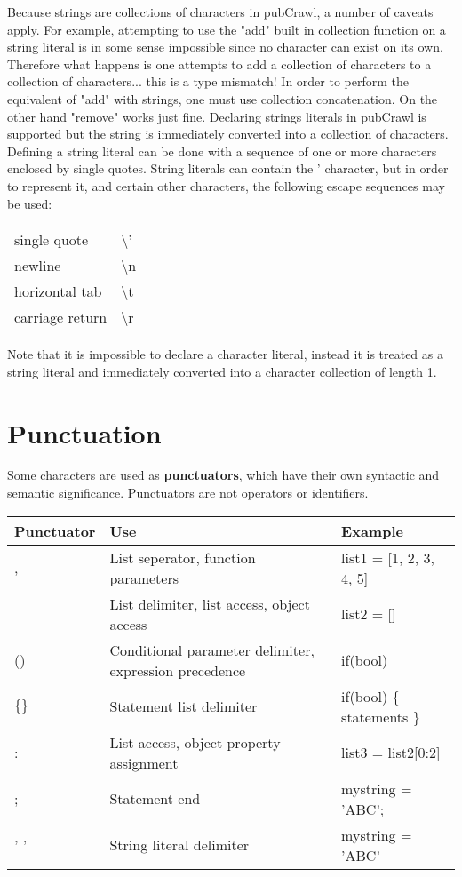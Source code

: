 \documentclass[oneside]{book}
\begin{document}
Because strings are collections of characters in pubCrawl, a number of caveats apply. For example, attempting to use the "add" built in collection function on a string literal is in some sense impossible since no character can exist on its own. Therefore what happens is one attempts to add a collection of characters to a collection of characters... this is a type mismatch! In order to perform the equivalent of "add" with strings, one must use collection concatenation. On the other hand "remove" works just fine. Declaring strings literals in pubCrawl is supported but the string is immediately converted into a collection of characters. Defining a string literal can be done with a sequence of one or more characters enclosed by single quotes. String literals can contain the ' character, but in order to represent it, and certain other characters, the following escape sequences may be used:
\begin{center}
  \begin{tabular}{l l}
  single quote&\textbackslash '\\
  newline&\textbackslash n\\
  horizontal tab&\textbackslash t\\
  carriage return&\textbackslash r\\
  \end{tabular}
\end{center}
Note that it is impossible to declare a character literal, instead it is treated as a string literal and immediately converted into a character collection of length 1.

\section{Punctuation}
Some characters are used as \textbf{punctuators}, which have their own syntactic and semantic significance. Punctuators are not operators or identifiers.\\
\begin{center}
  \begin{tabular}{| l | l | l |}
    \hline
    \textbf{Punctuator} & \textbf{Use} & \textbf{Example} \\ \hline
    , & List seperator, function parameters & list1 = [1, 2, 3, 4, 5] \\ \hline
    [] & List delimiter, list access, object access & list2 = [] \\ \hline
    () & Conditional parameter delimiter, expression precedence & if(bool)\\ \hline
    $\{\}$ & Statement list delimiter & if(bool) $\{$ statements $\}$\\ \hline
    : & List access, object property assignment & list3 = list2[0:2]\\ \hline
    ; & Statement end & mystring = 'ABC';\\ \hline
    ' ' & String literal delimiter & mystring = 'ABC'\\ \hline
    \hline
  \end{tabular}
\end{center}
\end{document}
